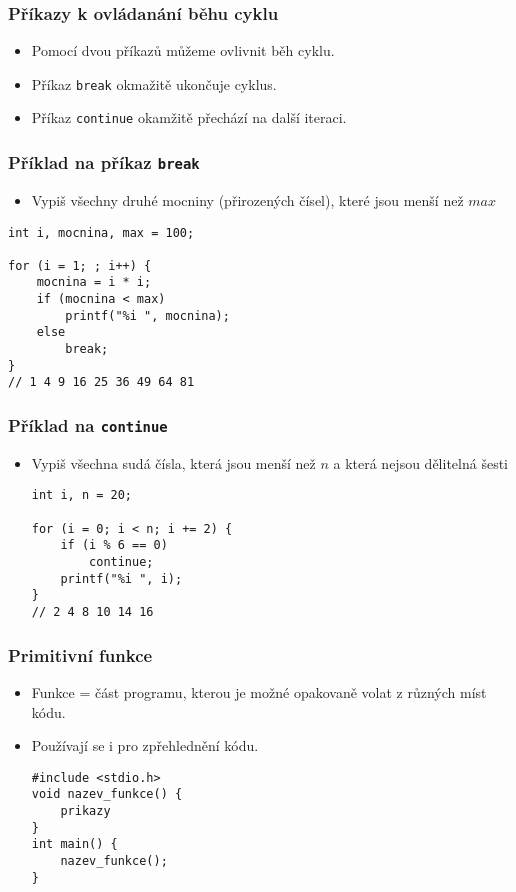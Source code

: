 \documentclass{beamer}
\newenvironment{itemizex}%
  {\large \begin{itemize}%
    \setlength{\itemsep}{8pt}%
    \setlength{\parskip}{8pt}}%
  {\end{itemize}}
\begin{document}
\begin{frame}[t,fragile]\frametitle{Příkazy k ovládanání běhu cyklu} 
  \begin{itemizex}
    \item Pomocí dvou příkazů můžeme ovlivnit běh cyklu.
    \item Příkaz \texttt{break} okmažitě ukončuje cyklus.
    \item Příkaz \texttt{continue} okamžitě přechází na další iteraci.
  \end{itemizex}
\end{frame}



\begin{frame}[t,fragile]\frametitle{Příklad na příkaz \texttt{break}} 
\begin{itemizex}
  \item Vypiš všechny druhé mocniny (přirozených čísel), které jsou menší než $max$ 
\end{itemizex}
\begin{verbatim} 
int i, mocnina, max = 100;

for (i = 1; ; i++) {
    mocnina = i * i;
    if (mocnina < max) 
        printf("%i ", mocnina);
    else
        break;
}
// 1 4 9 16 25 36 49 64 81
\end{verbatim}
\end{frame}


\begin{frame}[t,fragile]\frametitle{Příklad na \texttt{continue}} 
\begin{itemizex}
  \item Vypiš všechna sudá čísla, která jsou menší než $n$ a která nejsou dělitelná šesti
\begin{verbatim} 
int i, n = 20;

for (i = 0; i < n; i += 2) {
    if (i % 6 == 0)
        continue;
    printf("%i ", i);
}
// 2 4 8 10 14 16 
\end{verbatim}
\end{itemizex}
\end{frame}


\begin{frame}[t,fragile]\frametitle{Primitivní funkce} 
  \begin{itemizex}
    \item Funkce = část programu, kterou je možné opakovaně volat z různých míst kódu.
    \item Používají se i pro zpřehlednění kódu.
    \begin{verbatim} 
#include <stdio.h>
void nazev_funkce() {
    prikazy
}
int main() {
    nazev_funkce();
}
    \end{verbatim}
  \end{itemizex}
\end{frame}
\end{document}
